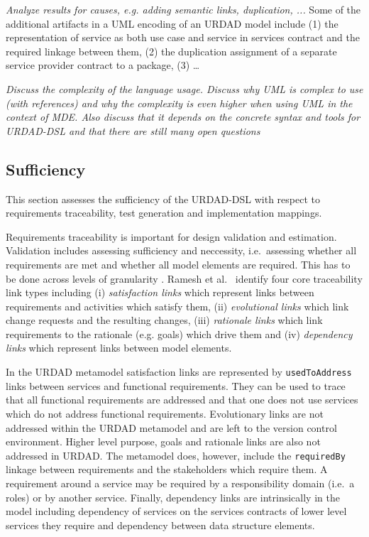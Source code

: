 \emph{Analyze results for causes, e.g. adding semantic links, duplication, ...} Some of the additional artifacts in a UML encoding of an URDAD model include (1) the representation of service as both use case and service in services contract and the required linkage between them, (2) the duplication assignment of a separate service provider contract to a package, (3) \dots

\emph{Discuss the complexity of the language usage. Discuss why UML is complex to use (with references) and why the complexity is even higher when using UML in the context of MDE. Also discuss that it depends on the concrete syntax and tools for URDAD-DSL and that there are still many open questions}


\subsection{Sufficiency}

This section assesses the sufficiency of the URDAD-DSL with respect to requirements traceability, test generation and implementation mappings. 

Requirements traceability is important for design validation and estimation. Validation includes assessing sufficiency and neccessity, i.e.\ assessing whether all requirements are met and whether all model elements are required. This has to be done across levels of granularity \cite{dick_design_2005}. Ramesh et al.\ \cite{ramesh_toward_2001} identify four core traceability link types including (i) \emph{satisfaction links} which represent links between requirements and activities which satisfy them, (ii) \emph{evolutional links} which link change requests and the resulting changes, (iii) \emph{rationale links} which link requirements to the rationale (e.g. goals) which drive them and (iv) \emph{dependency links} which represent links between model elements.

In the URDAD metamodel satisfaction links are represented by \verb+usedToAddress+ links between services and functional requirements. They can be used to trace that all functional requirements are addressed and that one does not use services which do not address functional requirements. Evolutionary links are not addressed within the URDAD metamodel and are left to the version control environment. Higher level purpose, goals and rationale links are also not addressed in URDAD. The metamodel does, however, include the \verb+requiredBy+ linkage between requirements and the stakeholders which require them. A requirement around a service may be required by a responsibility domain (i.e.\ a roles) or by another service. Finally, dependency links are intrinsically in the model including  dependency of services on the services contracts of lower level services they require and dependency between data structure elements. 

